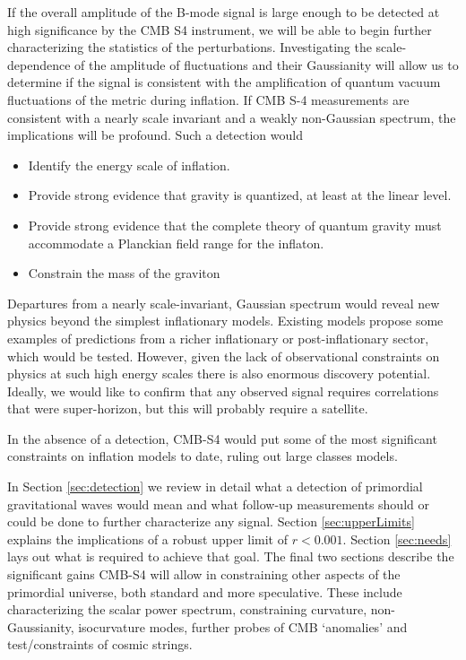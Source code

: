 If the overall amplitude of the B-mode signal is large enough to be detected at high significance by the CMB S4 instrument, we will be able to begin further characterizing the statistics of the perturbations. Investigating the scale-dependence of the amplitude of fluctuations and their Gaussianity will allow us to determine if the signal is consistent with the amplification of quantum vacuum fluctuations of the metric during inflation. If CMB S-4 measurements are consistent with a nearly scale invariant and a weakly non-Gaussian spectrum, the implications will be profound. Such a detection would
\begin{itemize}
 \item Identify the energy scale of inflation. 
  \item Provide strong evidence that gravity is quantized, at least at the linear level.
 \item Provide strong evidence that the complete theory of quantum gravity must accommodate a Planckian field range for the inflaton.
\item  Constrain the mass of the graviton
\end{itemize}
Departures from a nearly scale-invariant, Gaussian spectrum would reveal new physics beyond the simplest inflationary models. Existing models propose some examples of predictions from a richer inflationary or post-inflationary sector, which would be tested. However, given the lack of observational constraints on physics at such high energy scales there is also enormous discovery potential. Ideally, we would like to confirm that any observed signal requires correlations that were super-horizon, but this will probably require a satellite.

In the absence of a detection, CMB-S4 would put some of the most significant constraints on inflation models to date, ruling out large classes models. 

In Section \ref{sec:detection} we review in detail what a detection of primordial gravitational waves would mean and what follow-up measurements should or could be done to further characterize any signal. Section \ref{sec:upperLimits} explains the implications of a robust upper limit of $r<0.001$. Section \ref{sec:needs} lays out what is required to achieve that goal. The final two sections describe the significant gains CMB-S4 will allow in constraining other aspects of the primordial universe, both standard and more speculative. These include characterizing the scalar power spectrum, constraining curvature, non-Gaussianity, isocurvature modes, further probes of CMB `anomalies' and test/constraints of cosmic strings.
 
